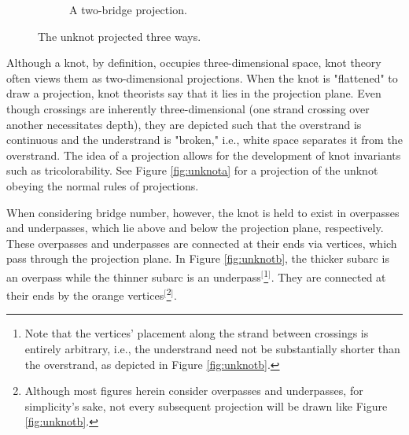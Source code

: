 \documentclass[titlepage]{article}
\begin{document}
\begin{figure}[h!]
\begin{subfigure}[b]{0.3\linewidth}
        \caption{A two-bridge projection.}
        \label{fig:unknotc}
    \end{subfigure}
    \caption{The unknot projected three ways.}
    \label{fig:unknot}
\end{figure}

\noindent Although a knot, by definition, occupies three-dimensional space, knot theory often views them as two-dimensional projections. When the knot is "flattened" to draw a projection, knot theorists say that it lies in the projection plane. Even though crossings are inherently three-dimensional (one strand crossing over another necessitates depth), they are depicted such that the overstrand is continuous and the understrand is "broken," i.e., white space separates it from the overstrand. The idea of a projection allows for the development of knot invariants such as tricolorability. See Figure \ref{fig:unknota} for a projection of the unknot obeying the normal rules of projections.\par
When considering bridge number, however, the knot is held to exist in overpasses and underpasses, which lie above and below the projection plane, respectively. These overpasses and underpasses are connected at their ends via vertices, which pass through the projection plane. In Figure \ref{fig:unknotb}, the thicker subarc is an overpass while the thinner subarc is an underpass$^[$\footnote{Note that the vertices' placement along the strand between crossings is entirely arbitrary, i.e., the understrand need not be substantially shorter than the overstrand, as depicted in Figure \ref{fig:unknotb}.}$^]$. They are connected at their ends by the orange vertices$^[$\footnote{Although most figures herein consider overpasses and underpasses, for simplicity's sake, not every subsequent projection will be drawn like Figure \ref{fig:unknotb}.}$^]$.\par
\end{document}
